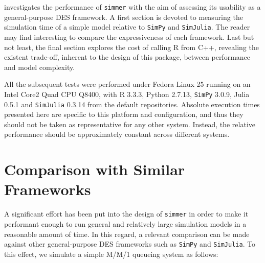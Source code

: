 \documentclass[twoside,nohyper]{tufte-book}
\theoremstyle{definition}
\theoremstyle{definition}
\theoremstyle{definition}
\theoremstyle{remark}
\begin{document}
 investigates the performance of
\texttt{simmer} with the aim of assessing its usability as a
general-purpose DES framework. A first section is devoted to measuring
the simulation time of a simple model relative to
\texttt{SimPy}\cite[0pt]{SimPy}
and
\texttt{SimJulia}\cite[0pt]{GitHub:SimJulia}.
The reader may find interesting to compare the expressiveness of each
framework. Last but not least, the final section explores the cost of
calling R from C++, revealing the existent trade-off, inherent to the
design of this package, between performance and model complexity.

All the subsequent tests were performed under Fedora Linux 25 running on
an Intel Core2 Quad CPU Q8400, with R 3.3.3, Python 2.7.13,
\texttt{SimPy} 3.0.9, Julia 0.5.1 and \texttt{SimJulia} 0.3.14 from the
default repositories. Absolute execution times presented here are
specific to this platform and configuration, and thus they should not be
taken as representative for any other system. Instead, the relative
performance should be approximately constant across different systems.

\section{Comparison with Similar
Frameworks}\label{comparison-with-similar-frameworks}

A significant effort has been put into the design of \texttt{simmer} in
order to make it performant enough to run general and relatively large
simulation models in a reasonable amount of time. In this regard, a
relevant comparison can be made against other general-purpose DES
frameworks such as \texttt{SimPy} and \texttt{SimJulia}. To this effect,
we simulate a simple M/M/1 queueing system as follows:
\end{document}
